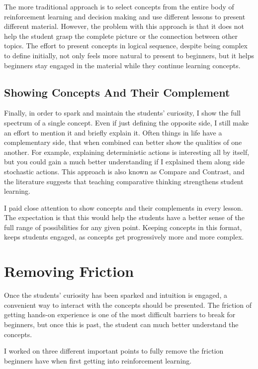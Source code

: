 \documentclass[11pt]{article} %
\begin{document}
The more traditional approach is to select concepts from the entire body of
reinforcement learning and decision making and use different lessons to present
different material. However, the problem with this approach is that it does
not help the student grasp the complete picture or the connection between other topics.
The effort to present concepts in logical sequence, despite being complex to define
initially, not only feels more natural to present to beginners, but it helps
beginners stay engaged in the material while they continue learning concepts.

\subsection{Showing Concepts And Their Complement}

Finally, in order to spark and maintain the students' curiosity, I show the
full spectrum of a single concept. Even if just defining the opposite side, I 
still make an effort to mention it and briefly explain it. Often things in
life have a complementary side, that when combined can better show the qualities
of one another. For example, explaining deterministic actions is interesting
all by itself, but you could gain a much better understanding if I explained
them along side stochastic actions. This approach is also known as Compare and
Contrast, and the literature suggests that teaching comparative thinking
strengthens student learning\cite{compare}.

I paid close attention to show concepts and their complements in every
lesson. The expectation is that this would help the students have a better
sense of the full range of possibilities for any given point. Keeping concepts
in this format, keeps students engaged, as concepts get progressively more
and more complex.

\section{Removing Friction}

Once the students' curiosity has been sparked and intuition is engaged, a
convenient way to interact with the concepts should be presented. The
friction of getting hands-on experience is one of the most difficult
barriers to break for beginners, but once this is past, the student can
much better understand the concepts.

I worked on three different important points to fully remove the friction
beginners have when first getting into reinforcement learning.
\end{document}
